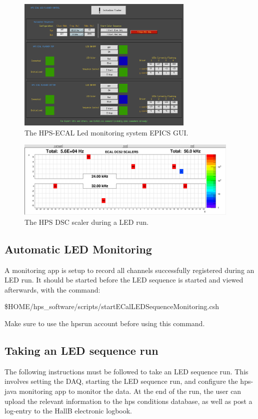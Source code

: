 \documentclass[12pt]{article}
\begin{document}
\begin{figure}[htbp]
\center
\includegraphics[width=0.75\textwidth]{pics/FlasherMEDM.png}
\caption{ \label{FlasherMEDM} The HPS-ECAL Led monitoring system EPICS GUI.}
\end{figure}
\begin{figure}[htbp]
\center
\includegraphics[width=0.95\textwidth]{pics/DSCScalersLED_2014_12_20.png}
\caption{ \label{LEDScalers} The HPS DSC scaler during a LED run.}
\end{figure}

\subsection{Automatic LED Monitoring}
A monitoring app is setup to record all channels successfully registered during an LED run.  It should be started before the LED sequence is started and viewed afterwards, with the command: \begin{center}\$HOME/hps\_software/scripts/startECalLEDSequenceMonitoring.csh\end{center} Make sure to use the hpsrun account before using this command.
  
\subsection{Taking an LED sequence run}
The following instructions must be followed to take an LED sequence run. This involves setting the DAQ, starting the LED sequence run, and configure the hps-java monitoring app to monitor the data. At the end of the run, the user can upload the relevant information to the hps conditions database, as well as post a log-entry to the HallB electronic logbook.
\end{document}
